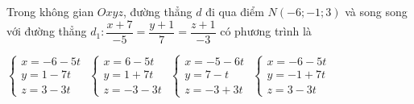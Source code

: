 \documentclass[12pt,a4paper]{article}
\begin{document}
\begin{ex}
 Trong không gian ${Oxyz}$, đường thẳng ${d}$ đi qua điểm ${N(-6;-1;3)}$ và song song với đường thẳng $d_1:\dfrac{x + 7}{-5}=\dfrac{y + 1}{7}=\dfrac{z + 1}{-3}$ có phương trình là
 
\choice
{ $\left\{ \begin{array}{l}x = -6-5t\\ y = 1-7t\\z = 3-3t\end{array} \right.$ }
   { $\left\{ \begin{array}{l}x = 6-5t\\ y = 1+7t\\z = -3-3t\end{array} \right.$ }
     { $\left\{ \begin{array}{l}x = -5-6t\\ y = 7-t\\z = -3+3t\end{array} \right.$ }
    { \True $\left\{ \begin{array}{l}x = -6-5t\\ y = -1+7t\\z = 3-3t\end{array} \right.$ }
\end{ex}
\end{document}
